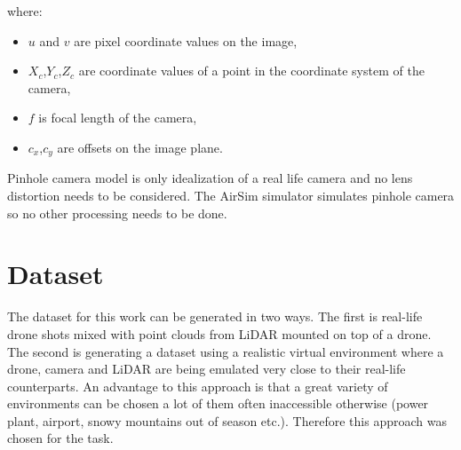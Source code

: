 \documentclass[twoside]{ctuthesis}
\theoremstyle{plain}
\theoremstyle{definition}
\theoremstyle{note}
\begin{document}
where:
\begin{itemize}
	\item $u$ and $v$ are pixel coordinate values on the image,
	\item $X_c$,$Y_c$,$Z_c$ are coordinate values of a point in the coordinate system of the camera,
	\item $f$ is focal length of the camera,
	\item $c_x$,$c_y$ are offsets on the image plane.
\end{itemize}
Pinhole camera model is only idealization of a real life camera and no lens distortion needs to be considered. The AirSim simulator simulates pinhole camera so no other processing needs to be done.
\section{Dataset}
The dataset for this work can be generated in two ways. The first is real-life drone shots mixed with point clouds from LiDAR mounted on top of a drone. The second is generating a dataset using a realistic virtual environment where a drone, camera and LiDAR are being emulated very close to their real-life counterparts. An advantage to this approach is that a great variety of environments can be chosen a lot of them often inaccessible otherwise (power plant, airport, snowy mountains out of season etc.). Therefore this approach was chosen for the task.
\end{document}
